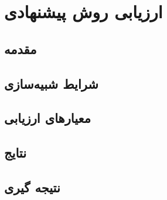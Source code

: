\chapter{ارزیابی روش پیشنهادی}

\section{مقدمه}
\section{شرایط شبیه‌سازی}
\section{معیار‌های ارزیابی}
\section{نتایج}
\section{نتیجه گیری}














